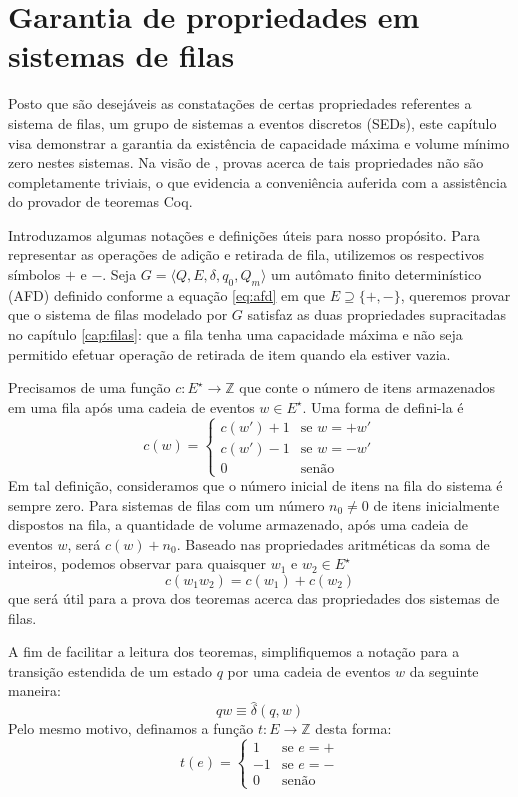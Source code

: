 \chapter{Garantia de propriedades em sistemas de filas}

Posto que são desejáveis as constatações de certas propriedades referentes a sistema de filas, um grupo de sistemas a eventos discretos (SEDs), este capítulo visa demonstrar a garantia da existência de capacidade máxima e volume mínimo zero nestes sistemas. Na visão de , provas acerca de tais propriedades não são completamente triviais, o que evidencia a conveniência auferida com a assistência do provador de teoremas Coq.

Introduzamos algumas notações e definições úteis para nosso propósito. Para representar as operações de adição e retirada de fila, utilizemos os respectivos símbolos $+$ e $-$. Seja $G = \langle Q, E, \delta, q_0, Q_m \rangle$ um autômato finito determinístico (AFD) definido conforme a equação \ref{eq:afd} em que $E \supseteq \{ +, - \}$, queremos provar que o sistema de filas modelado por $G$ satisfaz as duas propriedades supracitadas no capítulo \ref{cap:filas}: que a fila tenha uma capacidade máxima e não seja permitido efetuar operação de retirada de item quando ela estiver vazia.

Precisamos de uma função $c : E^\star \to \mathbb{Z}$ que conte o número de itens armazenados em uma fila após uma cadeia de eventos $w \in E^\star$. Uma forma de defini-la é $$c(w) = \begin{cases}
c(w') + 1 & \text{se $w=+w'$}\\
c(w') - 1 & \text{se $w=-w'$}\\
0 & \text{senão}
\end{cases}$$ Em tal definição, consideramos que o número inicial de itens na fila do sistema é sempre zero. Para sistemas de filas com um número $n_0 \neq 0$ de itens inicialmente dispostos na fila, a quantidade de volume armazenado, após uma cadeia de eventos $w$, será $c(w) + n_0$. Baseado nas propriedades aritméticas da soma de inteiros, podemos observar para quaisquer $w_1$ e $w_2 \in E^\star$ $$c(w_1w_2) = c(w_1) + c(w_2)$$ que será útil para a prova dos teoremas acerca das propriedades dos sistemas de filas.

A fim de facilitar a leitura dos teoremas, simplifiquemos a notação para a transição estendida de um estado $q$ por uma cadeia de eventos $w$ da seguinte maneira: $$qw \equiv \hat{\delta}(q,w)$$ Pelo mesmo motivo, definamos a função $t : E \to \mathbb{Z}$ desta forma: $$t(e) = \begin{cases}
1 & \text{se $e=+$} \\
-1 & \text{se $e=-$} \\
0 & \text{senão}
\end{cases}$$

